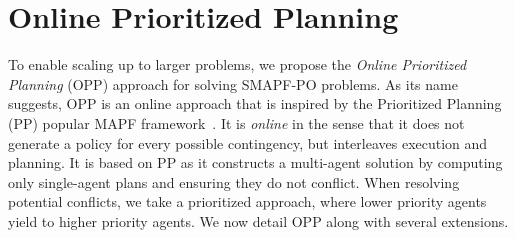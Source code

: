 \documentclass[letterpaper]{article} %
\newcommand{\plan}[1]{{\textcolor{blue}{[Plan: #1]}}}
\newcommand{\inon}[1]{ }
\newcommand{\roni}[1]{ }
\begin{document}




\section{Online Prioritized Planning}
\label{sec:online}



To enable scaling up to larger problems, we propose the \emph{Online Prioritized Planning} (OPP) approach for solving SMAPF-PO problems. 
As its name suggests, OPP is an online approach that is inspired by the Prioritized Planning (PP) popular MAPF framework~\cite{silver2005cooperative}. 
It is \emph{online} in the sense that it does not generate a policy for every possible contingency, but interleaves execution and planning. 
It is based on PP as it constructs a multi-agent solution by computing only single-agent plans 
and ensuring they do not conflict. When resolving potential conflicts, we take a prioritized approach, where lower priority agents yield to higher priority agents.
We now detail OPP along with several extensions.  
\end{document}
